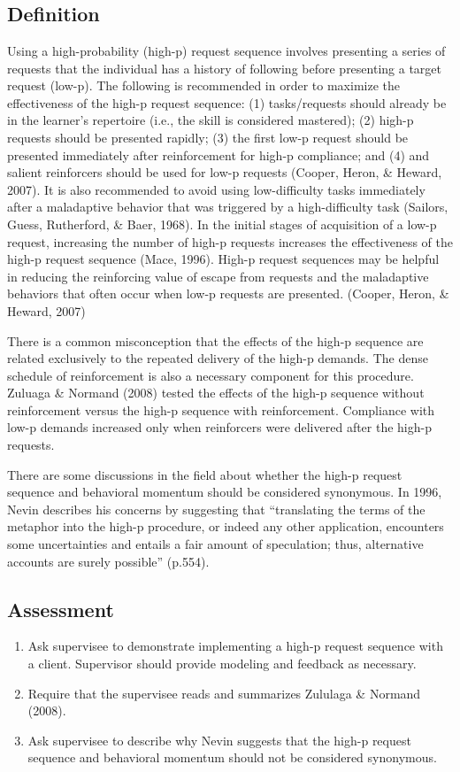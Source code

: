 \clearpage \section{\foureNine{}}
\subsection{Definition}
Using a high-probability (high-p) request sequence involves presenting a series of requests that the individual has a history of following before presenting a target request (low-p).  The following is recommended in order to maximize the effectiveness of the high-p request sequence: (1) tasks/requests should already be in the learner's repertoire (i.e., the skill is considered mastered); (2) high-p requests should be presented rapidly; (3) the first low-p request should be presented immediately after reinforcement for high-p compliance; and (4) and salient reinforcers should be used for low-p requests (Cooper, Heron, \& Heward, 2007).  It is also recommended to avoid using low-difficulty tasks immediately after a maladaptive behavior that was triggered by a high-difficulty task (Sailors, Guess, Rutherford, \& Baer, 1968).  In the initial stages of acquisition of a low-p request, increasing the number of high-p requests increases the effectiveness of the high-p request sequence (Mace, 1996).  High-p request sequences may be helpful in reducing the reinforcing value of escape from requests and the maladaptive behaviors that often occur when low-p requests are presented. (Cooper, Heron, \& Heward, 2007)

There is a common misconception that the effects of the high-p sequence are related exclusively to the repeated delivery of the high-p demands. The dense schedule of reinforcement is also a necessary component for this procedure. Zuluaga \& Normand (2008) tested the effects of the high-p sequence without reinforcement versus the high-p sequence with reinforcement. Compliance with low-p demands increased only when reinforcers were delivered after the high-p requests.

There are some discussions in the field about whether the high-p request sequence and behavioral momentum should be considered synonymous. In 1996, Nevin describes his concerns by suggesting that ``translating the terms of the metaphor into the high-p procedure, or indeed any other application, encounters some uncertainties and entails a fair amount of speculation; thus, alternative accounts are surely possible'' (p.554).
\subsection{Assessment}
\begin{enumerate}
\item Ask supervisee to demonstrate implementing a high-p request sequence with a client.  Supervisor should provide modeling and feedback as necessary.
\item Require that the supervisee reads and summarizes Zululaga \& Normand (2008).
\item Ask supervisee to describe why Nevin suggests that the high-p request sequence and behavioral momentum should not be considered synonymous.
\end{enumerate}
%
